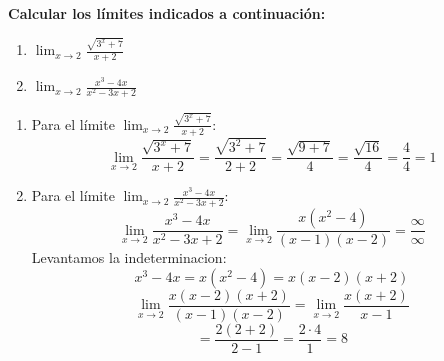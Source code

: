 \documentclass[answers]{exam}
\begin{document}
\begin{questions}
	\vspace{0.5cm}

	\question \large\textbf{Calcular los límites indicados a continuación:}
	\begin{enumerate}[label=\alph*.]
		\item $\displaystyle \lim_{x\to{2}} \frac{\sqrt{3^x+7}}{x+2}$
		\item $\displaystyle \lim_{x\to{2}} \frac{x^3-4x}{x^2-3x+2}$
	\end{enumerate}
	\vspace{0.5cm}
	\begin{solution}
		\begin{enumerate}[label=\alph*.]
			\item Para el límite $\displaystyle \lim_{x\to{2}} \frac{\sqrt{3^x+7}}{x+2}$:
			      \[
				      \lim_{x \to 2} \frac{\sqrt{3^x+7}}{x+2} = \frac{\sqrt{3^2+7}}{2+2} = \frac{\sqrt{9+7}}{4} = \frac{\sqrt{16}}{4} = \frac{4}{4} = 1
			      \]

			\item Para el límite $\displaystyle \lim_{x\to{2}} \frac{x^3-4x}{x^2-3x+2}$:
			      \[
				      \lim_{x \to 2} \frac{x^3-4x}{x^2-3x+2} = \lim_{x \to 2} \frac{x(x^2-4)}{(x-1)(x-2)}= \frac{\infty}{\infty}
			      \]
			      Levantamos la indeterminacion:
			      \[
				      x^3-4x = x(x^2-4) = x(x-2)(x+2)
			      \]
			      \[
				      \lim_{x \to 2} \frac{x(x-2)(x+2)}{(x-1)(x-2)} = \lim_{x \to 2} \frac{x(x+2)}{x-1}
			      \]
			      \vspace{0.1cm}
			      \[
				      = \frac{2(2+2)}{2-1} = \frac{2 \cdot 4}{1} = 8
			      \]
		\end{enumerate}
	\end{solution}

	\vspace{0.5cm}

\end{questions}
\end{document}
